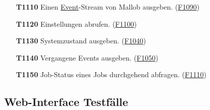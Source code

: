 \begin{itemize}
    \item[\textbf{T1110}] Einen \hyperref[B:Event]{Event}-\gls{Stream} von \gls{Mallob} ausgeben. (\hyperref[FA:API:Ausgeben eines Event-Streams von \gls{Mallob}]{F1090})

    \item[\textbf{T1120}] Einstellungen abrufen. (\hyperref[FA:API:Abrufen von Einstellungen]{F1100})
    
    \item[\textbf{T1130}] Systemzustand ausgeben. (\hyperref[FA:API:Ausgeben eines Systemzustandes]{F1040})
    
    \item[\textbf{T1140}] Vergangene Events ausgeben. (\hyperref[FA:API:Ausgeben von vergangenen Events]{F1050})
    
    \item[\textbf{T1150}] Job-Status eines Jobs durchgehend abfragen. (\hyperref[FA:API:Andauernde Abfrage des Ergebnisses eines Jobs]{F1110})
    
    

\end{itemize}

\subsection{\gls{Web-Interface} Testfälle}

